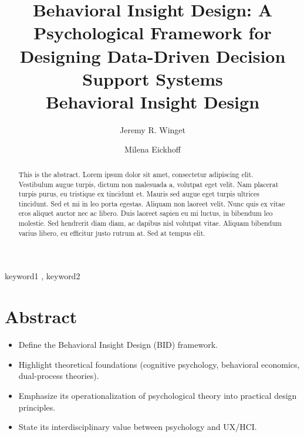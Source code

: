 \documentclass[
  authoryear,
  preprint]{elsarticle}
\providecommand{\tightlist}{%
  \setlength{\itemsep}{0pt}\setlength{\parskip}{0pt}}\usepackage{longtable,booktabs,array}
\begin{document}
\begin{frontmatter}
\title{Behavioral Insight Design: A Psychological Framework for
Designing Data-Driven Decision Support Systems \\\large{Behavioral
Insight Design} }
\author[1]{Jeremy R. Winget%
%
}
\author[2]{Milena Eickhoff%
%
}


        
\begin{abstract}
This is the abstract. Lorem ipsum dolor sit amet, consectetur adipiscing
elit. Vestibulum augue turpis, dictum non malesuada a, volutpat eget
velit. Nam placerat turpis purus, eu tristique ex tincidunt et. Mauris
sed augue eget turpis ultrices tincidunt. Sed et mi in leo porta
egestas. Aliquam non laoreet velit. Nunc quis ex vitae eros aliquet
auctor nec ac libero. Duis laoreet sapien eu mi luctus, in bibendum leo
molestie. Sed hendrerit diam diam, ac dapibus nisl volutpat vitae.
Aliquam bibendum varius libero, eu efficitur justo rutrum at. Sed at
tempus elit.
\end{abstract}





\begin{keyword}
    keyword1 \sep 
    keyword2
\end{keyword}
\end{frontmatter}
    

\section{Abstract}\label{abstract}

\begin{itemize}
\tightlist
\item
  Define the Behavioral Insight Design (BID) framework.
\item
  Highlight theoretical foundations (cognitive psychology, behavioral
  economics, dual-process theories).
\item
  Emphasize its operationalization of psychological theory into
  practical design principles.
\item
  State its interdisciplinary value between psychology and UX/HCI.
\end{itemize}
\end{document}
